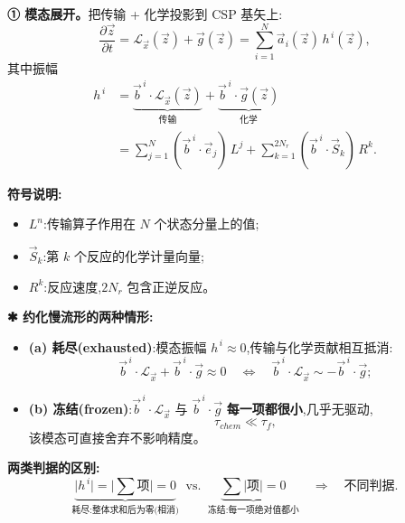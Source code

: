 \documentclass[11pt,a4paper]{article}
\newcommand{\pdiff}[2]{\dfrac{\partial #1}{\partial #2}}
\begin{document}
\medskip
\noindent\textbf{① 模态展开。}\quad 把传输 + 化学投影到 CSP 基矢上:
\begin{equation}
\pdiff{\vec z}{t}=\mathcal L_{\vec x}(\vec z)+\vec g(\vec z)=\sum_{i=1}^{N}\vec a_i(\vec z)\,h^{\,i}(\vec z),
\end{equation}
其中振幅
\begin{align}
h^{\,i}&=\underbrace{\vec b^{\,i}\cdot\mathcal L_{\vec x}(\vec z)}_{\text{传输}}+\underbrace{\vec b^{\,i}\cdot\vec g(\vec z)}_{\text{化学}}\nonumber\\
&=\sum_{j=1}^{N}(\vec b^{\,i}\cdot\vec e_j)\,L^{j}+\sum_{k=1}^{2N_r}(\vec b^{\,i}\cdot\vec S_k)\,R^{k}.
\end{align}

\noindent\textbf{符号说明:}
\begin{itemize}[leftmargin=2em]
\item $L^{n}$:传输算子作用在 $N$ 个状态分量上的值;
\item $\vec S_k$:第 $k$ 个反应的化学计量向量;
\item $R^{k}$:反应速度,$2N_r$ 包含正逆反应。
\end{itemize}

\medskip
\noindent\textbf{✱ 约化慢流形的两种情形:}
\begin{itemize}[leftmargin=2em]
\item \textbf{(a) 耗尽(exhausted)}:模态振幅 $h^{\,i}\approx 0$,传输与化学贡献相互抵消:
\begin{equation}
\vec b^{\,i}\cdot\mathcal L_{\vec x}+\vec b^{\,i}\cdot\vec g\approx 0\quad\Longleftrightarrow\quad\vec b^{\,i}\cdot\mathcal L_{\vec x}\sim-\vec b^{\,i}\cdot\vec g;
\end{equation}
\item \textbf{(b) 冻结(frozen)}:$\vec b^{\,i}\cdot\mathcal L_{\vec x}$ 与 $\vec b^{\,i}\cdot\vec g$ \textbf{每一项都很小},几乎无驱动,
\begin{equation}
\tau_{chem}\ll\tau_f,
\end{equation}
该模态可直接舍弃不影响精度。
\end{itemize}

\medskip
\noindent\textbf{两类判据的区别:}
\begin{equation}
\underbrace{\Big|h^{\,i}\Big|=\Big|\sum\text{项}\Big|=0}_{\text{耗尽:整体求和后为零(相消)}}\;\;\text{vs.}\;\;\underbrace{\sum\big|\text{项}\big|=0}_{\text{冻结:每一项绝对值都小}}\quad\Rightarrow\quad\text{不同判据}.
\end{equation}
\end{document}
